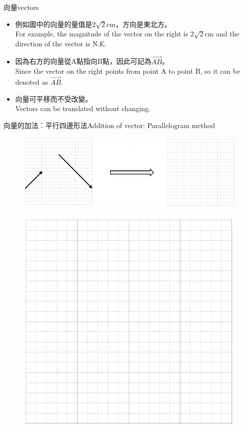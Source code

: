 \documentclass[beamer=true]{standalone}
\begin{document}
\begin{frame}{向量vectors}
    \begin{itemize}
        \item 例如圖中的向量的量值是$2\sqrt{2}$cm，方向是東北方。 \\For example, the magnitude of the vector on the right is $2\sqrt{2}$cm and the direction of the vector is N.E.
        \item 因為右方的向量從A點指向B點，因此可記為$\vec{AB}$。 \\Since the vector on the right points from point A to point B, so it can be denoted as $\vec{AB}$.
        \item
              向量可平移而不受改變。\\Vectors can be translated without changing.
    \end{itemize}
    \begin{figure}[h!]
        \centering
    \end{figure}
\end{frame}
\begin{frame}{向量的加法︰平行四邊形法Addition of vector: Parallelogram method}
    \begin{figure}[h!]
        \centering
        \includegraphics[width=.9\textwidth]{../../assets/3cc60b5d.png}
    \end{figure}
    \begin{figure}[h!]
        \centering
        \includegraphics[width=.3\textwidth]{../../assets/45d03651.png}
    \end{figure}
\end{frame}
\end{document}

